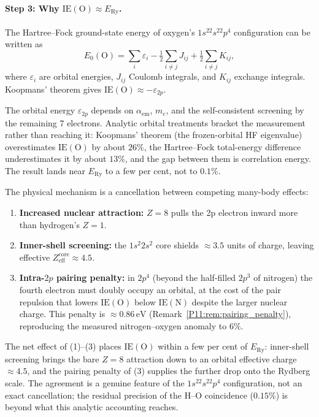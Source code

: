 \documentclass[11pt,a4paper]{article}
\theoremstyle{definition}
\theoremstyle{remark}
\newcommand{\ERy}{E_{\mathrm{Ry}}}
\newcommand{\aem}{\alpha_{\mathrm{em}}}
\newcommand{\IE}{\mathrm{IE}}
\begin{document}
\paragraph{Step 3: Why $\IE(\mathrm{O}) \approx \ERy$.}
The Hartree--Fock ground-state energy of oxygen's $1s^22s^22p^4$ configuration
can be written as
\begin{equation}
  E_0(\mathrm{O}) = \sum_i \varepsilon_i - \tfrac{1}{2}\sum_{i\neq j}J_{ij}
  + \tfrac{1}{2}\sum_{i\neq j}K_{ij},
\end{equation}
where $\varepsilon_i$ are orbital energies, $J_{ij}$ Coulomb integrals,
and $K_{ij}$ exchange integrals.  Koopmans' theorem gives
$\IE(\mathrm{O}) \approx -\varepsilon_{2p}$.

The orbital energy $\varepsilon_{2p}$ depends on $\aem$, $m_e$, and
the self-consistent screening by the remaining 7 electrons.
Analytic orbital treatments bracket the measurement rather than
reaching it: Koopmans' theorem (the frozen-orbital HF eigenvalue)
overestimates $\IE(\mathrm{O})$ by about $26\%$, the Hartree--Fock
total-energy difference underestimates it by about $13\%$, and the gap
between them is correlation energy.  The result lands near $\ERy$ to a
few per cent, not to $0.1\%$.

The physical mechanism is a cancellation between competing many-body effects:
\begin{enumerate}[noitemsep]
\item \textbf{Increased nuclear attraction:} $Z=8$ pulls the 2p electron
  inward more than hydrogen's $Z=1$.
\item \textbf{Inner-shell screening:} the $1s^2 2s^2$ core shields $\approx 3.5$
  units of charge, leaving effective $Z_\mathrm{eff}^\mathrm{core} \approx 4.5$.
\item \textbf{Intra-$2p$ pairing penalty:} in $2p^4$ (beyond the
  half-filled $2p^3$ of nitrogen) the fourth electron must doubly
  occupy an orbital, at the cost of the pair repulsion that lowers
  $\IE(\mathrm{O})$ below $\IE(\mathrm{N})$ despite the larger nuclear
  charge.  This penalty is $\approx 0.86\,\mathrm{eV}$
  (Remark~\ref{P11:rem:pairing_penalty}), reproducing the measured
  nitrogen--oxygen anomaly to $6\%$.
\end{enumerate}
The net effect of (1)--(3) places $\IE(\mathrm{O})$ within a few per
cent of $\ERy$: inner-shell screening brings the bare $Z=8$ attraction
down to an orbital effective charge $\approx4.5$, and the pairing
penalty of (3) supplies the further drop onto the Rydberg scale.  The
agreement is a genuine feature of the $1s^22s^22p^4$ configuration, not
an exact cancellation; the residual precision of the H--O coincidence
($0.15\%$) is beyond what this analytic accounting reaches.
\end{document}
